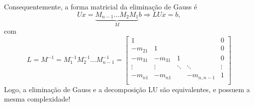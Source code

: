 \documentclass[../numerical_methods.tex]{subfiles}
\begin{document}
Consequentemente, a forma matricial da eliminação de Gauss é
\[
	Ux = \underbrace{M_{n-1}\dotsc M_{2}M_{1}}_{M}b \Rightarrow LUx = b,
\]
com
\[
	L = M^{-1} = M_{1}^{-1}M_{2}^{-1}\dotsc M_{n-1}^{-1} =\begin{bmatrix}
		1       &         &        &             & 0      \\
		-m_{21} & 1       &        &             & 0      \\
		-m_{31} & -m_{31} & 1      &             & 0      \\
		\vdots  & \vdots  & \ddots & \ddots      & \vdots \\
		-m_{n1} & -m_{n1} &        & -m_{n, n-1} & 1      \\
	\end{bmatrix}
\]
Logo, a eliminação de Gauss e a decomposição LU são equivalentes, e possuem a mesma complexidade!
\end{document}
